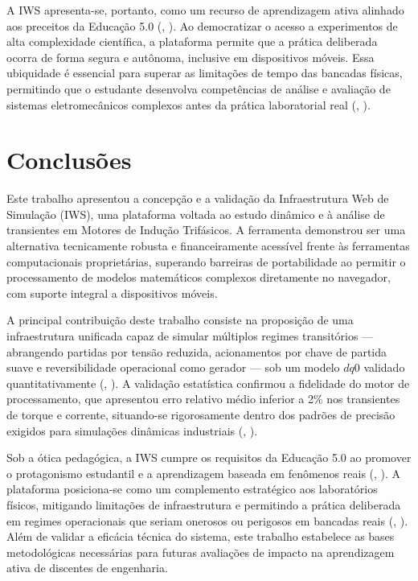 \documentclass[a4paper]{ifacconf}
\begin{document}
A IWS apresenta-se, portanto, como um recurso de aprendizagem ativa alinhado aos preceitos da Educação 5.0 (\citeauthor{cordeiro2024educacao}, \citeyear{cordeiro2024educacao}). Ao democratizar o acesso a experimentos de alta complexidade científica, a plataforma permite que a prática deliberada ocorra de forma segura e autônoma, inclusive em dispositivos móveis. Essa ubiquidade é essencial para superar as limitações de tempo das bancadas físicas, permitindo que o estudante desenvolva competências de análise e avaliação de sistemas eletromecânicos complexos antes da prática laboratorial real (\citeauthor{singh2019improving}, \citeyear{singh2019improving}).

\section{Conclusões}

Este trabalho apresentou a concepção e a validação da Infraestrutura Web de Simulação (IWS), uma plataforma voltada ao estudo dinâmico e à análise de transientes em Motores de Indução Trifásicos. A ferramenta demonstrou ser uma alternativa tecnicamente robusta e financeiramente acessível frente às ferramentas computacionais proprietárias, superando barreiras de portabilidade ao permitir o processamento de modelos matemáticos complexos diretamente no navegador, com suporte integral a dispositivos móveis.

A principal contribuição deste trabalho consiste na proposição de uma infraestrutura unificada capaz de simular múltiplos regimes transitórios — abrangendo partidas por tensão reduzida, acionamentos por chave de partida suave e reversibilidade operacional como gerador — sob um modelo $dq0$ validado quantitativamente (\citeauthor{usta2024mathematical}, \citeyear{usta2024mathematical}). A validação estatística confirmou a fidelidade do motor de processamento, que apresentou erro relativo médio inferior a 2\% nos transientes de torque e corrente, situando-se rigorosamente dentro dos padrões de precisão exigidos para simulações dinâmicas industriais (\citeauthor{leroux2022static}, \citeyear{leroux2022static}).

Sob a ótica pedagógica, a IWS cumpre os requisitos da Educação 5.0 ao promover o protagonismo estudantil e a aprendizagem baseada em fenômenos reais (\citeauthor{cordeiro2024educacao}, \citeyear{cordeiro2024educacao}). A plataforma posiciona-se como um complemento estratégico aos laboratórios físicos, mitigando limitações de infraestrutura e permitindo a prática deliberada em regimes operacionais que seriam onerosos ou perigosos em bancadas reais (\citeauthor{singh2019improving}, \citeyear{singh2019improving}). Além de validar a eficácia técnica do sistema, este trabalho estabelece as bases metodológicas necessárias para futuras avaliações de impacto na aprendizagem ativa de discentes de engenharia.
\end{document}
